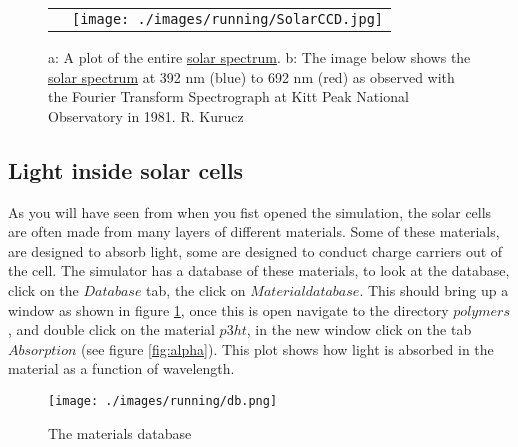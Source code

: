 \begin{figure}[H]
\centering
\begin{tabular}{ c c }

\raisebox{-.1\height}{\texttt{[image: ./images/running/spectrum.png]}}

&
\texttt{[image: ./images/running/SolarCCD.jpg]}
\\
\end{tabular}
\caption{a: A plot of the entire \href{https://commons.wikimedia.org/wiki/File:Solar_Spectrum.png}{solar spectrum}. b: The image below shows the \href{https://solarsystem.nasa.gov/resources/390/the-solar-spectrum/}{solar spectrum} at 392 nm (blue) to 692 nm (red) as observed with the Fourier Transform Spectrograph at Kitt Peak National Observatory in 1981. R. Kurucz }
\end{figure}


\vspace*{\fill}

\newpage
\subsection{Light inside solar cells}
As you will have seen from when you fist opened the simulation, the solar cells are often made from many layers of different materials.  Some of these materials, are designed to absorb light, some are designed to conduct charge carriers out of the cell.  The simulator has a database of these materials, to look at the database, click on the $Database$ tab, the click on $Material database$.  This should bring up a window as shown in figure \ref{fig:db}, once this is open navigate to the directory $polymers$, and double click on the material $p3ht$, in the new window click on the tab $Absorption$ (see figure \ref{fig:alpha}).  This plot shows how light is absorbed in the material as a function of wavelength.

\begin{figure}[h!]
\centering
\texttt{[image: ./images/running/db.png]}
\caption{The materials database}
\label{fig:db}
\end{figure}

